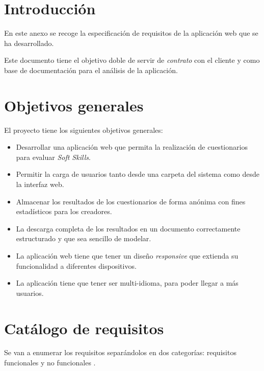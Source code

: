 
\section{Introducción}

En este anexo se recoge la especificación de requisitos de la aplicación web que se ha desarrollado.

Este documento tiene el objetivo doble de servir de \textit{contrato} con el cliente y como base de documentación para el análisis de la aplicación.

\section{Objetivos generales}

El proyecto tiene los siguientes objetivos generales:

\begin{itemize}
	\item Desarrollar una aplicación web que permita la realización de cuestionarios para evaluar \textit{Soft Skills}.
	\item Permitir la carga de usuarios tanto desde una carpeta del sistema como desde la interfaz web.
	\item Almacenar los resultados de los cuestionarios de forma anónima con fines estadísticos para los creadores.
	\item La descarga completa de los resultados en un documento correctamente estructurado y que sea sencillo de modelar.
	\item La aplicación web tiene que tener un diseño \textit{responsive} que extienda su funcionalidad a diferentes dispositivos.
	\item La aplicación tiene que tener ser multi-idioma, para poder llegar a más usuarios.
\end{itemize}

\section{Catálogo de requisitos}

Se van a enumerar los requisitos separándolos en dos categorías: requisitos funcionales y no funcionales \cite{web:requisitos}.

